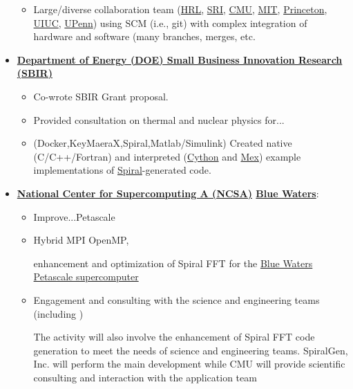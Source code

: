 \documentclass{article}
\begin{document}
\begin{itemize}
\begin{itemize}
    \item Large/diverse collaboration team (\href{http://www.hrl.com/}{HRL}, \href{http://www.sri.com/}{SRI}, \href{http://www.cmu.edu/}{CMU}, \href{http://web.mit.edu/}{MIT}, \href{http://www.princeton.edu/}{Princeton}, \href{http://illinois.edu/}{UIUC}, \href{http://www.upenn.edu/}{UPenn}) using SCM (i.e., git) with complex integration of hardware and software (many branches, merges, etc.

  \end{itemize}

\item \textbf{\href{http://science.energy.gov/sbir/}{Department of Energy (DOE) Small Business Innovation Research (SBIR)}}

  \begin{itemize}
    \item Co-wrote SBIR Grant proposal. 
    \item Provided consultation on thermal and nuclear physics for...
    \item (Docker,KeyMaeraX,Spiral,Matlab/Simulink) Created  native (C/C++/Fortran) and interpreted (\href{http://cython.org/}{Cython} and \href{http://www.mathworks.com/help/matlab/ref/mex.html}{Mex}) example implementations of \href{http://spiral.net/}{Spiral}-generated code. 
  \end{itemize}

\item \textbf{\href{http://www.ncsa.illinois.edu}{National Center for Supercomputing A (NCSA)} \href{http://www.ncsa.illinois.edu/enabling/bluewaters}{Blue Waters}}:

  \begin{itemize}
    \item Improve...Petascale 
    \item Hybrid MPI OpenMP,  

enhancement and optimization of Spiral FFT for the \href{http://www.ncsa.illinois.edu/enabling/bluewaters}{Blue Waters Petascale supercomputer}

    \item Engagement and consulting with the science and engineering teams (including )

 The activity will also involve the enhancement of Spiral FFT code generation to meet the needs of science and engineering teams. SpiralGen, Inc. will perform the main development while CMU will provide scientific consulting and interaction with the application team

  \end{itemize}
  


\end{itemize}
\end{document}
